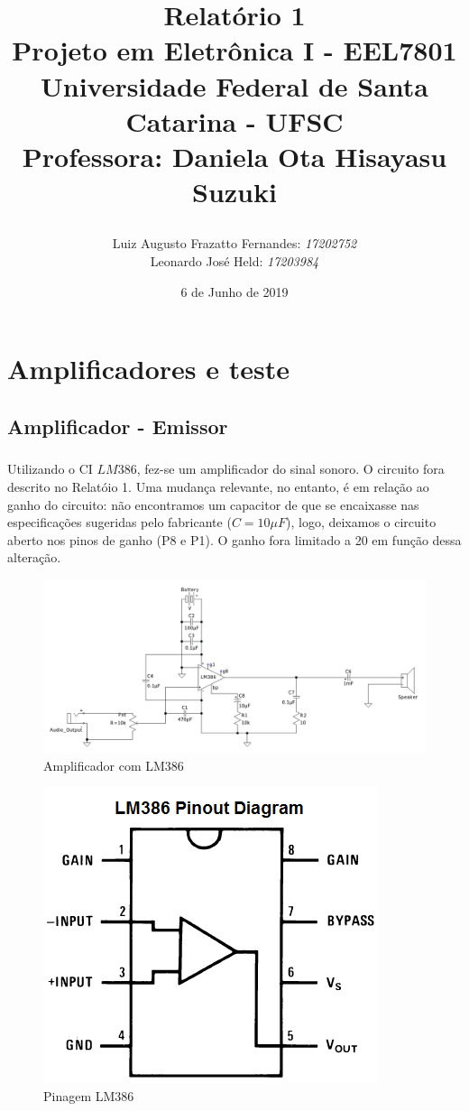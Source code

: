 \documentclass[12pt,a4paper]{report}
\title{Relatório 1  \\
	Projeto em Eletrônica I - EEL7801 \\ \vfill
	\normalsize{Universidade Federal de Santa Catarina - UFSC \\
		Professora: Daniela Ota Hisayasu Suzuki}
	\author{
		{Luiz Augusto Frazatto Fernandes: \it{17202752}} \\
		{Leonardo José Held: \it{17203984}}
	}
}
\date{6 de Junho de 2019}
\begin{document}
	\maketitle
	\setcounter{chapter}{0}
	\chapter{Amplificadores e teste}
	\section{Amplificador - Emissor}
		\paragraph{} Utilizando o CI $LM386$, fez-se um amplificador do sinal sonoro. O circuito fora descrito no Relatóio 1. Uma mudança relevante, no entanto, é em relação ao ganho do circuito: não encontramos um capacitor de que se encaixasse nas especificações sugeridas pelo fabricante ($C = 10\mu{F}$), logo, deixamos o circuito aberto nos pinos de ganho (P8 e P1). O ganho fora limitado a 20 em função dessa alteração.\\
		
		\begin{figure}[h]
			\centering
			\includegraphics[width=\linewidth]{corrected_amplifier.png}
			\caption{Amplificador com LM386}
			\label{fig:amplifier386}
		\end{figure}
		
		
		\begin{figure}[h]
			\centering
			\includegraphics[width=.3\linewidth]{LM386_pinout_diagram.png}
			\caption{Pinagem LM386}
			\label{fig:pinout386}
		\end{figure}
		
\end{document}
